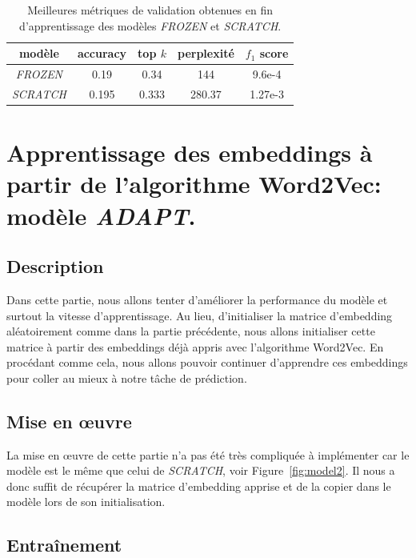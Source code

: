 \documentclass[a4paper]{article}
\begin{document}
\begin{table}[ht]
    \centering
    \begin{tabular}{|c|c|c|c|c|}
        \hline
        modèle & accuracy  & top $k$  & perplexité  & $f_1$ score \\
        \hline
        \textit{FROZEN} & 0.19 & 0.34  & 144 & 9.6e-4 \\
        \hline
        \textit{SCRATCH} & 0.195 & 0.333  & 280.37 & 1.27e-3 \\
        \hline
    \end{tabular}
    \caption{Meilleures métriques de validation obtenues en fin d'apprentissage des modèles \textit{FROZEN} et \textit{SCRATCH}.}
    \label{tab:metriques model2}
\end{table}


\section{Apprentissage des embeddings à partir de l'algorithme Word2Vec: modèle \textit{ADAPT}.}

\subsection{Description}

Dans cette partie, nous allons tenter d'améliorer la performance du modèle et surtout la vitesse d'apprentissage. Au lieu,
d'initialiser la matrice d'embedding aléatoirement comme dans la partie précédente, nous allons initialiser cette 
matrice à partir des embeddings déjà appris avec l'algorithme Word2Vec. En procédant comme cela, nous allons pouvoir
continuer d'apprendre ces embeddings pour coller au mieux à notre tâche de prédiction.

\subsection{Mise en \oe uvre}

La mise en \oe uvre de cette partie n'a pas été très compliquée à implémenter car le modèle est le même que celui de 
\textit{SCRATCH}, voir Figure~\ref{fig:model2}. Il nous a donc suffit de récupérer la matrice d'embedding apprise et de 
la copier dans le modèle lors de son initialisation.

\subsection{Entraînement}
\end{document}
